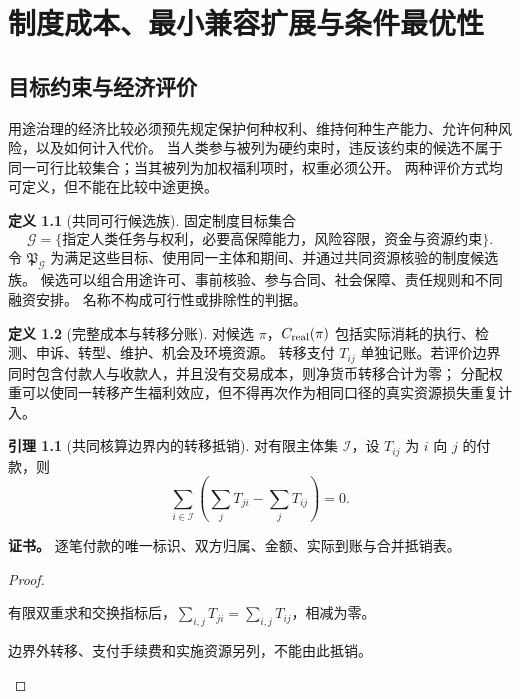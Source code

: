 \documentclass[UTF8,12pt,a4paper,openany,fontset=none,zihao=false]{ctexrep}
\theoremstyle{definition}
\newtheorem{definition}{定义}[chapter]
\newtheorem{lemma}{引理}[chapter]
\newenvironment{certificate}{\par\noindent\textbf{证书。}\ignorespaces}{\par}
\newcommand{\1}{\mathbf 1}
\begin{document}
\chapter{制度成本、最小兼容扩展与条件最优性}
\label{opt:chapter}

\section{目标约束与经济评价}

用途治理的经济比较必须预先规定保护何种权利、维持何种生产能力、允许何种风险，以及如何计入代价。
当人类参与被列为硬约束时，违反该约束的候选不属于同一可行比较集合；当其被列为加权福利项时，权重必须公开。
两种评价方式均可定义，但不能在比较中途更换。

\begin{definition}[共同可行候选族]
固定制度目标集合
\[
\mathcal G=\{\text{指定人类任务与权利，必要高保障能力，风险容限，资金与资源约束}\}.
\]
令 \(\mathfrak P_{\mathcal G}\) 为满足这些目标、使用同一主体和期间、并通过共同资源核验的制度候选族。
候选可以组合用途许可、事前核验、参与合同、社会保障、责任规则和不同融资安排。
名称不构成可行性或排除性的判据。
\end{definition}

\begin{definition}[完整成本与转移分账]
对候选 \(\pi\)，\(C_{\rm real}(\pi)\) 包括实际消耗的执行、检测、申诉、转型、维护、机会及环境资源。
转移支付 \(T_{ij}\) 单独记账。若评价边界同时包含付款人与收款人，并且没有交易成本，则净货币转移合计为零；
分配权重可以使同一转移产生福利效应，但不得再次作为相同口径的真实资源损失重复计入。
\end{definition}

\begin{lemma}[共同核算边界内的转移抵销]
\label{opt:transfer}
对有限主体集 \(\mathcal I\)，设 \(T_{ij}\) 为 \(i\) 向 \(j\) 的付款，则
\[
\sum_{i\in\mathcal I}\left(\sum_jT_{ji}-\sum_jT_{ij}\right)=0.
\]
\end{lemma}
\begin{certificate}
逐笔付款的唯一标识、双方归属、金额、实际到账与合并抵销表。
\end{certificate}
\begin{proof}
\begin{semanticsteps}
\item 有限双重求和交换指标后，\(\sum_{i,j}T_{ji}=\sum_{i,j}T_{ij}\)，相减为零。
\item 边界外转移、支付手续费和实施资源另列，不能由此抵销。
\end{semanticsteps}
\end{proof}
\end{document}

